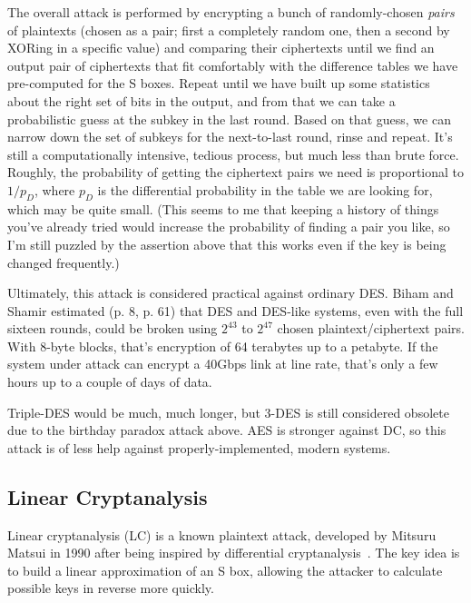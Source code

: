 The overall attack is performed by encrypting a bunch of
randomly-chosen \emph{pairs} of plaintexts (chosen as a pair; first a
completely random one, then a second by XORing in a specific value)
and comparing their ciphertexts until we find an output pair of
ciphertexts that fit comfortably with the difference tables we have
pre-computed for the S boxes.  Repeat until we have built up some
statistics about the right set of bits in the output, and from that we
can take a probabilistic guess at the subkey in the last round.  Based
on that guess, we can narrow down the set of subkeys for the
next-to-last round, rinse and repeat.  It's still a computationally
intensive, tedious process, but much less than brute force.  Roughly,
the probability of getting the ciphertext pairs we need is
proportional to $1/p_D$,  where $p_D$ is the differential probability
in the table we are looking for, which may be quite small.  (This
seems to me that keeping a history of things you've already tried
would increase the probability of finding a pair you like, so I'm
still puzzled by the assertion above that this works even if the key
is being changed frequently.) \aono{}

Ultimately, this attack is considered practical against ordinary DES.
Biham and Shamir estimated (p. 8, p. 61) that DES and DES-like
systems, even with the full sixteen rounds, could be broken using
$2^{43}$ to $2^{47}$ chosen plaintext/ciphertext pairs.  With 8-byte
blocks, that's encryption of 64 terabytes up to a petabyte.  If the
system under attack can encrypt a 40Gbps link at line rate, that's
only a few hours up to a couple of days of data.

Triple-DES would be much, much longer, but 3-DES is still considered
obsolete due to the birthday paradox attack above.  AES is stronger
against DC, so this attack is of less help against
properly-implemented, modern systems.

\aono{}

\subsection{Linear Cryptanalysis}

Linear cryptanalysis (LC) is a known plaintext attack, developed by
Mitsuru Matsui in 1990 after being inspired by differential
cryptanalysis~\cite{matsui1993linear,heys:tutorial}.  The key idea is
to build a linear approximation of an S box, allowing the attacker to
calculate possible keys in reverse more quickly.

